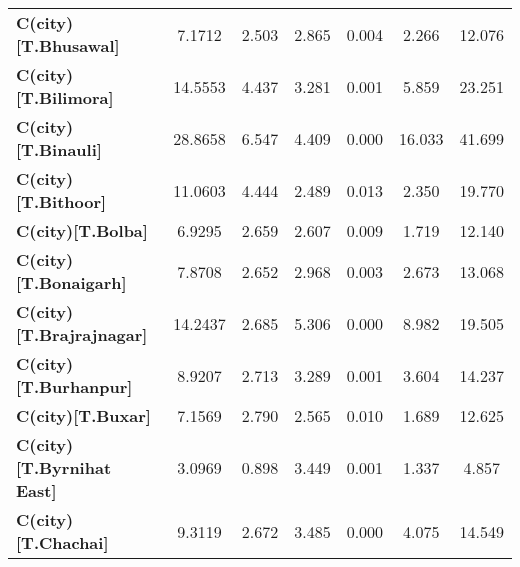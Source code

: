 \begin{center}
\begin{tabular}{lcccccc}
\textbf{C(city)[T.Bhusawal]}                                                                        &       7.1712  &        2.503     &     2.865  &         0.004        &        2.266    &       12.076     \\
\textbf{C(city)[T.Bilimora]}                                                                        &      14.5553  &        4.437     &     3.281  &         0.001        &        5.859    &       23.251     \\
\textbf{C(city)[T.Binauli]}                                                                         &      28.8658  &        6.547     &     4.409  &         0.000        &       16.033    &       41.699     \\
\textbf{C(city)[T.Bithoor]}                                                                         &      11.0603  &        4.444     &     2.489  &         0.013        &        2.350    &       19.770     \\
\textbf{C(city)[T.Bolba]}                                                                           &       6.9295  &        2.659     &     2.607  &         0.009        &        1.719    &       12.140     \\
\textbf{C(city)[T.Bonaigarh]}                                                                       &       7.8708  &        2.652     &     2.968  &         0.003        &        2.673    &       13.068     \\
\textbf{C(city)[T.Brajrajnagar]}                                                                    &      14.2437  &        2.685     &     5.306  &         0.000        &        8.982    &       19.505     \\
\textbf{C(city)[T.Burhanpur]}                                                                       &       8.9207  &        2.713     &     3.289  &         0.001        &        3.604    &       14.237     \\
\textbf{C(city)[T.Buxar]}                                                                           &       7.1569  &        2.790     &     2.565  &         0.010        &        1.689    &       12.625     \\
\textbf{C(city)[T.Byrnihat East]}                                                                   &       3.0969  &        0.898     &     3.449  &         0.001        &        1.337    &        4.857     \\
\textbf{C(city)[T.Chachai]}                                                                         &       9.3119  &        2.672     &     3.485  &         0.000        &        4.075    &       14.549     \\

\end{tabular}
\end{center}

